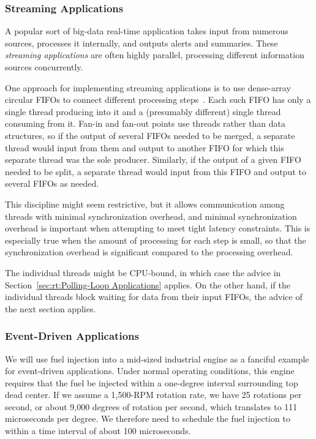\subsubsection{Streaming Applications}
\label{sec:rt:Streaming Applications}

A popular sort of big-data real-time application takes input from numerous
sources, processes it internally, and outputs alerts and summaries.
These \emph{streaming applications} are often highly parallel, processing
different information sources concurrently.

One approach for implementing streaming applications is to use
dense-array circular FIFOs to connect different processing
steps~\cite{AdrianSutton2013LCA:Disruptor}.
Each such FIFO has only a single thread producing into it and a
(presumably different) single thread consuming from it.
Fan-in and fan-out points use threads rather than data structures,
so if the output of several FIFOs needed to be merged, a separate
thread would input from them and output to another FIFO for which
this separate thread was the sole producer.
Similarly, if the output of a given FIFO needed to be split, a separate
thread would input from this FIFO and output to several FIFOs as needed.

This discipline might seem restrictive, but it allows communication
among threads with minimal synchronization overhead, and minimal
synchronization overhead is important when attempting to meet
tight latency constraints.
This is especially true when the amount of processing for each step
is small, so that the synchronization overhead is significant compared
to the processing overhead.

The individual threads might be CPU-bound, in which case the advice in
Section~\ref{sec:rt:Polling-Loop Applications} applies.
On the other hand, if the individual threads block waiting for
data from their input FIFOs, the advice of the next section applies.

\subsubsection{Event-Driven Applications}
\label{sec:rt:Event-Driven Applications}

We will use fuel injection into a mid-sized industrial engine as a
fanciful example for event-driven applications.
Under normal operating conditions, this engine requires that the fuel
be injected within a one-degree interval surrounding top dead center.
If we assume a 1,500-RPM rotation rate, we have 25 rotations per second,
or about 9,000 degrees of rotation per second, which translates to
111 microseconds per degree.
We therefore need to schedule the fuel injection to within a time
interval of about 100 microseconds.

